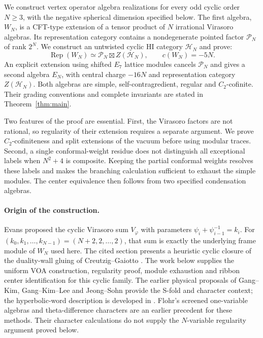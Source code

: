 \documentclass[11pt,a4paper]{article}
\numberwithin{equation}{section}
\theoremstyle{definition}\newtheorem{definition}[theorem]{Definition}
\theoremstyle{remark}\newtheorem{remark}[theorem]{Remark}
\begin{document}
We construct vertex operator algebra realizations for every odd cyclic
order $N\geq3$, with the negative spherical dimension specified below.
The first algebra, $W_N$, is a CFT-type extension of a tensor product
of $N$ irrational Virasoro algebras. Its representation category
contains a nondegenerate pointed factor $\mathcal P_N$ of rank $2^N$.
We construct an untwisted cyclic HI category $\mathcal H_N$ and prove:
\[
 \operatorname{Rep}(W_N)\simeq
 \mathcal P_N\boxtimes Z(\mathcal H_N),
 \qquad c(W_N)=-5N.
\]
An explicit extension using shifted $E_7$ lattice modules cancels
$\mathcal P_N$ and gives a second algebra $E_N$, with central charge
$-16N$ and representation category $Z(\mathcal H_N)$. Both algebras
are simple, self-contragredient, regular and $C_2$-cofinite. Their
grading conventions and complete invariants are stated in
Theorem~\ref{thm:main}.

Two features of the proof are essential. First, the Virasoro factors
are not rational, so regularity of their extension requires a separate
argument. We prove $C_2$-cofiniteness and split extensions of the
vacuum before using modular traces. Second, a single conformal-weight residue does not distinguish
all exceptional labels when $N^2+4$ is composite. Keeping the partial conformal weights resolves these
labels and makes the branching calculation sufficient to exhaust
the simple modules. The center equivalence then follows from two
specified condensation algebras.

\paragraph{Origin of the construction.}
Evans \cite[Section 6.2]{evanssfold} proposed the cyclic Virasoro sum
$V_\varphi$ with parameters $\psi_i+\psi_{i-1}^{-1}=k_i$.
For $(k_0,k_1,\ldots,k_{N-1})=(N+2,2,\ldots,2)$, that sum is exactly
the underlying frame module of $W_N$ used here. The cited section
presents a heuristic cyclic closure of the duality-wall gluing of
Creutzig--Gaiotto \cite{cgduality}. The work below supplies the uniform
VOA construction, regularity proof, module exhaustion and ribbon
center identification for this cyclic family. The earlier physical
proposals of Gang--Kim, Gang--Kim--Lee and Jeong--Sohn
\cite{gangkim,gangkimlee,jeongsohn} provide the S-fold and character
context; the hyperbolic-word description is developed in
\cite{evanswords}. Flohr's screened one-variable algebras and theta-difference
characters \cite{flohr1993,flohr1994} are an earlier precedent for
these methods. Their character calculations do not supply the
$N$-variable regularity argument proved below.
\end{document}
